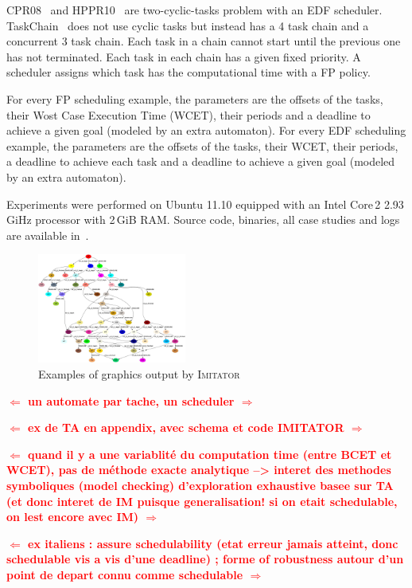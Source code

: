 \documentclass{llncs}
\newcommand{\imitator}{\textsc{Imitator}}
\newcommand{\commentaire}[1]{\textcolor{red}{\textbf{$\Leftarrow$  #1 $\Rightarrow$}}}
\begin{document}
CPR08~\cite{CPR08} and HPPR10~\cite{LPPRC10} are two-cyclic-tasks problem with an EDF scheduler.
	TaskChain~\cite{SGL97} does not use cyclic tasks but instead has a 4 task chain and a concurrent 3 task chain.
		Each task in a chain cannot start until the previous one has not terminated.
		Each task in each chain has a given fixed priority.
		A scheduler assigns which task has the computational time with a FP policy.

For every FP scheduling example, the parameters are the offsets of the tasks, their Wost Case Execution Time (WCET), their periods and a deadline to achieve a given goal (modeled by an extra automaton).
	For every EDF scheduling example, the parameters are the offsets of the tasks, their WCET, their periods, a deadline to achieve each task and a deadline to achieve a given goal (modeled by an extra automaton).

	

Experiments were performed on Ubuntu 11.10 equipped with an Intel Core\,2 2.93\,GiHz processor with 2\,GiB RAM.
Source code, binaries, all case studies and logs are available in~\cite{imitator-web}.

\begin{figure}[ht!]
	\centering
		\includegraphics[height=3.6cm]{traceset.jpg}
	\caption{Examples of graphics output by \imitator{}}
	\label{fig:output}
\end{figure}

\commentaire{
un automate par tache, un scheduler
}

\commentaire{
ex de TA en appendix, avec schema et code IMITATOR
}

\commentaire{
quand il y a une variablité du computation time (entre BCET et WCET), pas de méthode exacte analytique --> interet des methodes symboliques (model checking) d'exploration exhaustive basee sur TA (et donc interet de IM puisque generalisation! si on etait schedulable, on lest encore avec IM)
}

\commentaire{
ex italiens : assure schedulability (etat erreur jamais atteint, donc schedulable vis a vis d'une deadline) ; forme of robustness autour d'un point de depart connu comme schedulable
}
\end{document}
